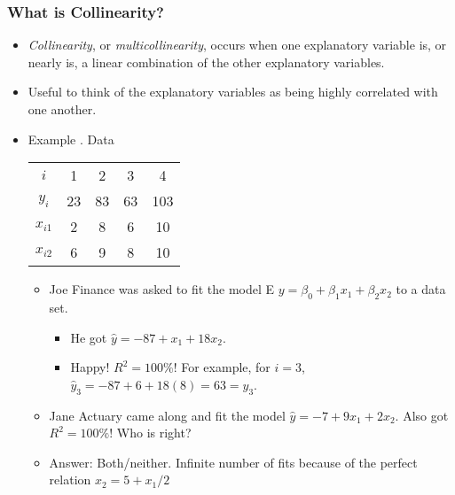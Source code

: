 \begin{frame}[shrink=2]
 \frametitle{What is Collinearity?}
 \begin{itemize}
  \item \textit{Collinearity}, or \textit{multicollinearity}, occurs when
one explanatory variable is, or nearly is, a linear combination of
the other explanatory variables.
  \item Useful to think
of the explanatory variables as being highly correlated with one
another.
   \item Example . Data
\begin{center}
\begin{tabular}{ccccc}
\hline
$i$ & 1 & 2 & 3 & 4 \\
$y_{i}$ & 23 & 83 & 63 & 103 \\
$x_{i1}$ & 2 & 8 & 6 & 10 \\
$x_{i2}$ & 6 & 9 & 8 & 10 \\ \hline
\end{tabular}%
\end{center}
 \begin{itemize}%
\item Joe Finance was asked to fit the model E
$y=\beta _{0}+\beta _{1}x_{1}+\beta _{2}x_{2}$ to a data set.
\begin{itemize}
  \item  He got $\hat{y}=-87+x_{1}+18x_{2}.$
\item Happy! $R^2 = 100\% !$ For example, for $i=3$,
$\hat{y}_{3}=-87+6+18(8)=63 = y_{3}$.
   \end{itemize}
\item  Jane Actuary came along and fit the model
$\hat{y}=-7+9x_{1}+2x_{2}.$ Also got $R^2 = 100\% !$ Who is right?
\item Answer: Both/neither. Infinite number of fits because of the
perfect relation $x_{2}=5+x_{1}/2$
    \end{itemize}    \end{itemize}
\end{frame}


